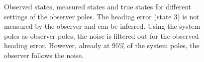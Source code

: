 \begin{figure}[h]
\begin{subfigure}{0.49\textwidth}
	\end{subfigure}	
	\caption{Observed states, measured states and true states for different settings of the observer poles. The heading error (state 3) is not measured by the observer and can be inferred. Using the system poles as observer poles, the noise is filtered out for the observed heading error. However, already at $95\%$ of the system poles, the observer follows the noise.}
	\label{fig:observer_result_states}
\end{figure}